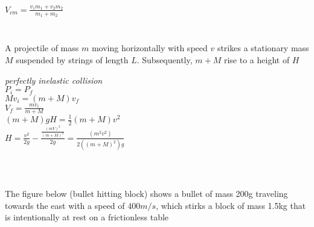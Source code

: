\documentclass{article}
\begin{document}
$V_{cm} = \frac{v_1m_1+v_2m_2}{m_1 + m_2 }$\\[15pt]


\hrulefill
\subsubsection{}
\hrulefill \\[15pt]

A projectile of mass $m$ moving horizontally with speed $v$ strikes a stationary mass $M$ suspended by strings of length $L$. Subsequently, $m+M$ rise to a height of $H$

\textit{perfectly inelastic collision}\\[20pt]

$P_i = P_f $\\[15pt]

$Mv_i = (m+M)v_f$\\[15pt]

$V_f = \frac{mv_i}{m+M}$\\[15pt]

$(m+M)gH = \frac{1}{2}(m+M)v^2$\\[15pt]

$H= \frac{v^2}{2g} - \frac{\frac{(mV)^2}{(m+M)^2}}{2g} = \frac{(m^2v^2)}{2((m+M)^2)g}$\\[15pt]

\hrulefill\\[15pt]


\pagebreak
\hrulefill
\subsubsection{}
\hrulefill \\[15pt]

The figure below (bullet hitting block) shows a bullet of mass 200g traveling towards the east with a speed of $400m/s$, which stirks a block of  mass 1.5kg that is intentionally at rest on a frictionless table \\[15pt]

\end{document}
